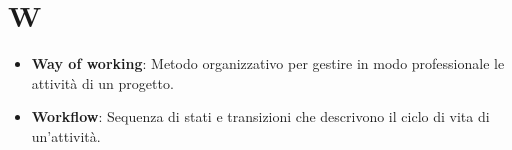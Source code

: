 \section{W}
\begin{itemize}
    \item \textbf{Way of working}: Metodo organizzativo per gestire in modo professionale le attività di un progetto.
    \item \textbf{Workflow}: Sequenza di stati e transizioni che descrivono il ciclo di vita di un’attività.
\end{itemize}
